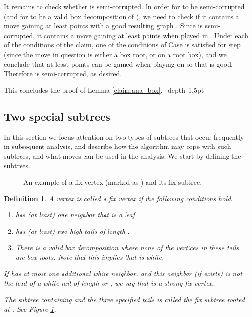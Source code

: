 \documentclass[11pt]{article}
\def\blackslug{\hbox{\hskip 1pt \vrule width 4pt height 8pt
    depth 1.5pt \hskip 1pt}}
\def\QED{\quad\blackslug\lower 8.5pt\null\par}
\def\dnsitem{\vspace{-7pt}\item}
\newtheorem{definition}[theorem]{Definition}
\theoremstyle{definition}
\begin{document}
It remains to check whether  is semi-corrupted.
In order for  to be semi-corrupted (and for  to be a valid box decomposition of ), we need to check if it contains a move  gaining at least  points with a good resulting graph .
Since  is semi-corrupted, it contains a move  gaining at least  points when played in .
Under each of the conditions of the claim, one of the conditions of Case  is satisfied for step  (since the move  in question is either a box root, or on a root box), and we conclude that at least  points can be gained when playing on  so that  is good. Therefore  is semi-corrupted, as desired.

This concludes the proof of Lemma \ref{claim:ana_box}.
\QED

\subsection{Two special subtrees}
\label{sub:special_subtrees}

In this section we focus attention on two types of subtrees that occur frequently in subsequent analysis, 
and describe how the algorithm may cope with such subtrees, and what moves can be used in the analysis.
We start by defining the subtrees.

\begin{figure}[thbp]
  \caption{\sf An example of a fix vertex (marked as ) and its fix subtree.}
  \medskip
  \centering
  \label{fig:tu_vertex}
\end{figure}
\begin{definition}
A vertex  is called a \emph{fix} vertex if the following conditions hold.
\begin{enumerate}
	\dnsitem  has (at least) one neighbor that is a  leaf.
	\dnsitem  has (at least) two high tails of length .
	\dnsitem There is a valid box decomposition where none of the vertices in these tails are box roots. 
		Note that this implies that  is white.
\end{enumerate}
If  has at most one additional white neighbor, and this neighbor (if exists) is not the lead of a white tail of length  or , 
we say that  is a \emph{strong fix} vertex. 

The subtree containing  and the three specified tails is called the \emph{fix subtree rooted at }.
See Figure \ref{fig:tu_vertex}.
\end{definition}
\end{document}
